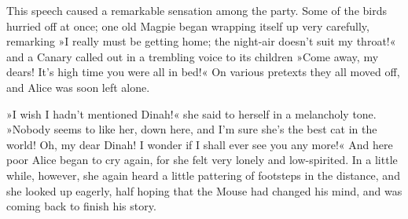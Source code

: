 This speech caused a remarkable sensation among the party. Some of the birds hurried off at once; one old Magpie began wrapping itself up very carefully, remarking »I really must be getting home; the night-air doesn't suit my throat!« and a Canary called out in a trembling voice to its children »Come away, my dears! It's high time you were all in bed!« On various pretexts they all moved off, and Alice was soon left alone.

»I wish I hadn't mentioned Dinah!« she said to herself in a melancholy tone. »Nobody seems to like her, down here, and I'm sure she's the best cat in the world! Oh, my dear Dinah! I wonder if I shall ever see you any more!« And here poor Alice began to cry again, for she felt very lonely and low-spirited. In a little while, however, she again heard a little pattering of footsteps in the distance, and she looked up eagerly, half hoping that the Mouse had changed his mind, and was coming back to finish his story.